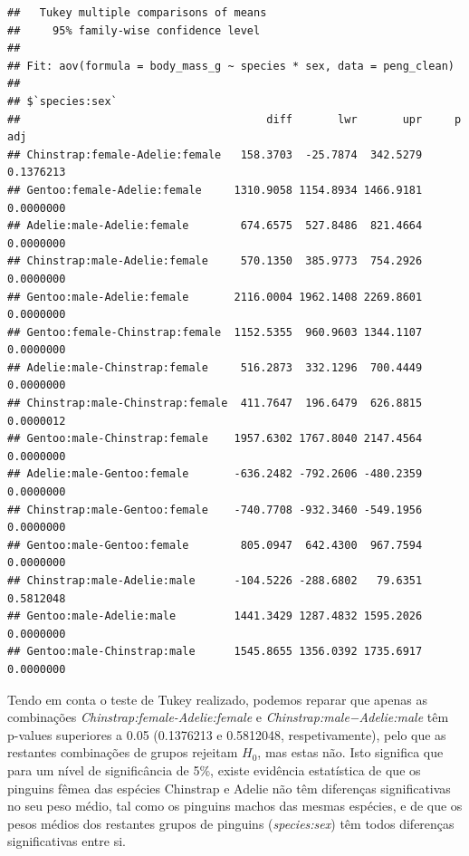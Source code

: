 \documentclass[]{article}
\begin{document}
\begin{Shaded}
\begin{Highlighting}[]
\NormalTok{)}
\end{Highlighting}
\end{Shaded}

\begin{verbatim}
##   Tukey multiple comparisons of means
##     95% family-wise confidence level
## 
## Fit: aov(formula = body_mass_g ~ species * sex, data = peng_clean)
## 
## $`species:sex`
##                                      diff       lwr       upr     p adj
## Chinstrap:female-Adelie:female   158.3703  -25.7874  342.5279 0.1376213
## Gentoo:female-Adelie:female     1310.9058 1154.8934 1466.9181 0.0000000
## Adelie:male-Adelie:female        674.6575  527.8486  821.4664 0.0000000
## Chinstrap:male-Adelie:female     570.1350  385.9773  754.2926 0.0000000
## Gentoo:male-Adelie:female       2116.0004 1962.1408 2269.8601 0.0000000
## Gentoo:female-Chinstrap:female  1152.5355  960.9603 1344.1107 0.0000000
## Adelie:male-Chinstrap:female     516.2873  332.1296  700.4449 0.0000000
## Chinstrap:male-Chinstrap:female  411.7647  196.6479  626.8815 0.0000012
## Gentoo:male-Chinstrap:female    1957.6302 1767.8040 2147.4564 0.0000000
## Adelie:male-Gentoo:female       -636.2482 -792.2606 -480.2359 0.0000000
## Chinstrap:male-Gentoo:female    -740.7708 -932.3460 -549.1956 0.0000000
## Gentoo:male-Gentoo:female        805.0947  642.4300  967.7594 0.0000000
## Chinstrap:male-Adelie:male      -104.5226 -288.6802   79.6351 0.5812048
## Gentoo:male-Adelie:male         1441.3429 1287.4832 1595.2026 0.0000000
## Gentoo:male-Chinstrap:male      1545.8655 1356.0392 1735.6917 0.0000000
\end{verbatim}

Tendo em conta o teste de Tukey realizado, podemos reparar que apenas as
combinações \textit{Chinstrap:female-Adelie:female} e
\textit{Chinstrap:male−Adelie:male} têm p-values superiores a 0.05
(0.1376213 e 0.5812048, respetivamente), pelo que as restantes
combinações de grupos rejeitam \(H_0\), mas estas não. Isto significa
que para um nível de significância de 5\%, existe evidência estatística
de que os pinguins fêmea das espécies Chinstrap e Adelie não têm
diferenças significativas no seu peso médio, tal como os pinguins machos
das mesmas espécies, e de que os pesos médios dos restantes grupos de
pinguins (\emph{species:sex}) têm todos diferenças significativas entre
si.
\end{document}
